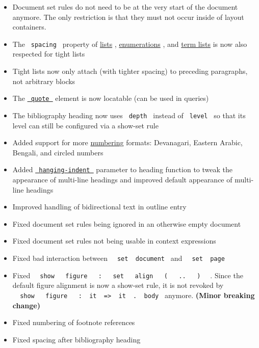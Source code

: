 \begin{itemize}
\tightlist
\item
  Document set rules do not need to be at the very start of the document
  anymore. The only restriction is that they must not occur inside of
  layout containers.
\item
  The \texttt{\ spacing\ } property of
  \href{/docs/reference/model/list/\#parameters-spacing}{lists} ,
  \href{/docs/reference/model/enum/\#parameters-spacing}{enumerations} ,
  and \href{/docs/reference/model/terms/\#parameters-spacing}{term
  lists} is now also respected for tight lists
\item
  Tight lists now only attach (with tighter spacing) to preceding
  paragraphs, not arbitrary blocks
\item
  The \href{/docs/reference/model/quote/}{\texttt{\ quote\ }} element is
  now locatable (can be used in queries)
\item
  The bibliography heading now uses \texttt{\ depth\ } instead of
  \texttt{\ level\ } so that its level can still be configured via a
  show-set rule
\item
  Added support for more
  \href{/docs/reference/model/numbering/}{numbering} formats:
  Devanagari, Eastern Arabic, Bengali, and circled numbers
\item
  Added
  \href{/docs/reference/model/heading/\#parameters-hanging-indent}{\texttt{\ hanging-indent\ }}
  parameter to heading function to tweak the appearance of multi-line
  headings and improved default appearance of multi-line headings
\item
  Improved handling of bidirectional text in outline entry
\item
  Fixed document set rules being ignored in an otherwise empty document
\item
  Fixed document set rules not being usable in context expressions
\item
  Fixed bad interaction between
  \texttt{\ }{\texttt{\ set\ }}\texttt{\ document\ } and
  \texttt{\ }{\texttt{\ set\ }}\texttt{\ page\ }
\item
  Fixed
  \texttt{\ }{\texttt{\ show\ }}\texttt{\ }{\texttt{\ figure\ }}\texttt{\ }{\texttt{\ :\ }}\texttt{\ }{\texttt{\ set\ }}\texttt{\ }{\texttt{\ align\ }}\texttt{\ }{\texttt{\ (\ }}\texttt{\ }{\texttt{\ ..\ }}\texttt{\ }{\texttt{\ )\ }}\texttt{\ }
  . Since the default figure alignment is now a show-set rule, it is not
  revoked by
  \texttt{\ }{\texttt{\ show\ }}\texttt{\ }{\texttt{\ figure\ }}\texttt{\ }{\texttt{\ :\ }}\texttt{\ it\ }{\texttt{\ =\textgreater{}\ }}\texttt{\ it\ }{\texttt{\ .\ }}\texttt{\ body\ }
  anymore. \textbf{(Minor breaking change)}
\item
  Fixed numbering of footnote references
\item
  Fixed spacing after bibliography heading
\end{itemize}

